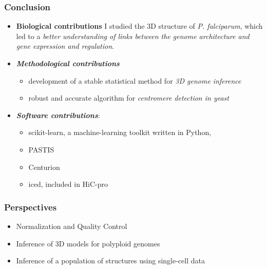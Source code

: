 \documentclass[xcolor=dvipsnames]{beamer}
\begin{document}
\begin{frame}
\frametitle{Conclusion}
\begin{itemize}[label={$\bullet$}]
\item \textbf{Biological contributions} I
studied the 3D structure of {\em P. falciparum}, which led to a \textit{better
understanding of links between the genome architecture and gene expression and
regulation}.
\item \textbf{\em Methodological contributions}
\begin{itemize}[label={$\bullet$}]
\item development of a stable statistical method for \textit{3D genome
inference}
\item robust and accurate algorithm for \textit{centromere detection in yeast} 
\end{itemize}
\item \textbf{\em Software contributions}: 
\begin{itemize}[label={$\bullet$}]
\item scikit-learn, a machine-learning toolkit written in Python,
\item PASTIS
\item Centurion
\item iced, included in HiC-pro
\end{itemize}
\end{itemize}
\end{frame}

\begin{frame}
\frametitle{Perspectives}
\begin{itemize}[label={$\bullet$}]
\item Normalization and Quality Control
\item Inference of 3D models for polyploid genomes
\item Inference of a population of structures using single-cell data 
\end{itemize}
\end{frame}
\end{document}
